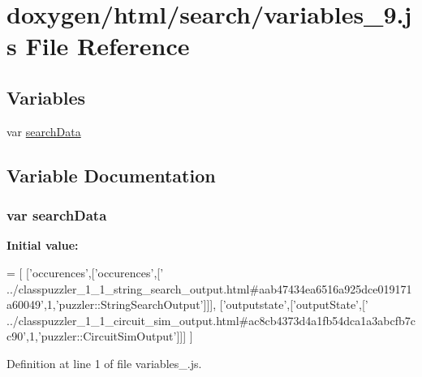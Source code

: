 \hypertarget{a00113}{}\section{doxygen/html/search/variables\+\_\+9.js File Reference}
\label{a00113}
\subsection*{Variables}
\begin{DoxyCompactItemize}
\item 
var \hyperlink{a00113_ad01a7523f103d6242ef9b0451861231e}{search\+Data}
\end{DoxyCompactItemize}


\subsection{Variable Documentation}
\hypertarget{a00113_ad01a7523f103d6242ef9b0451861231e}{}
\subsubsection[{search\+Data}]{\setlength{\rightskip}{0pt plus 5cm}var search\+Data}\label{a00113_ad01a7523f103d6242ef9b0451861231e}
{\bfseries Initial value\+:}
\begin{DoxyCode}
=
[
  [\textcolor{stringliteral}{'occurences'},[\textcolor{stringliteral}{'occurences'},[\textcolor{stringliteral}{'
      ../classpuzzler\_1\_1\_string\_search\_output.html#aab47434ea6516a925dce019171a60049'},1,\textcolor{stringliteral}{'puzzler::StringSearchOutput'}]]],
  [\textcolor{stringliteral}{'outputstate'},[\textcolor{stringliteral}{'outputState'},[\textcolor{stringliteral}{'
      ../classpuzzler\_1\_1\_circuit\_sim\_output.html#ac8cb4373d4a1fb54dca1a3abcfb7cc90'},1,\textcolor{stringliteral}{'puzzler::CircuitSimOutput'}]]]
]
\end{DoxyCode}


Definition at line 1 of file variables\+\_.\+js.

